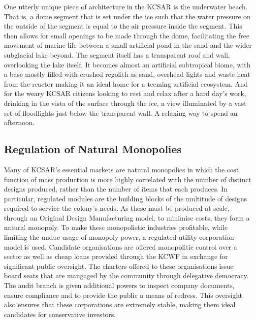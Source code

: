 \documentclass[fleqn,10pt]{Stylesheet} %
\begin{document}
One utterly unique piece of architecture in the KCSAR is the underwater beach. That is, a dome segment that is set under the ice such that the water pressure on the outside of the segment is equal to the air pressure inside the segment. This then allows for small openings to be made through the dome, facilitating the free movement of marine life between a small artificial pond in the sand and the wider subglacial lake beyond. The segment itself has a transparent roof and wall, overlooking the lake itself. It becomes almost an artificial subtropical biome, with a base mostly filled with crushed regolith as sand, overhead lights and waste heat from the reactor making it an ideal home for a teeming artificial ecosystem. And for the weary KCSAR citizens looking to rest and relax after a hard day's work, drinking in the vista of the surface through the ice, a view illuminated by a vast set of floodlights just below the transparent wall. A relaxing way to spend an afternoon.

\subsection{Regulation of Natural Monopolies}
Many of KCSAR's essential markets are natural monopolies in which the cost function of mass production is more highly correlated with the number of distinct designs produced, rather than the number of items that each produces. In particular, regulated modules are the building blocks of the multitude of designs required to service the colony's needs. As these must be produced at scale, through an Original Design Manufacturing model, to minimise costs, they form a natural monopoly. To make these monopolistic industries profitable, while limiting the undue usage of monopoly power, a regulated utility corporation model is used. Candidate organisations are offered monopolitic control over a sector as well as cheap loans provided through the KCWF in exchange for significant public oversight. The charters offered to these organisations issue board seats that are mangaged by the community through delegative democracy. The audit branch is given additional powers to inspect company documents, ensure compliance and to provide the public a means of redress. This oversight also ensures that these corporations are extremely stable, making them ideal candidates for conservative investors.
\end{document}
